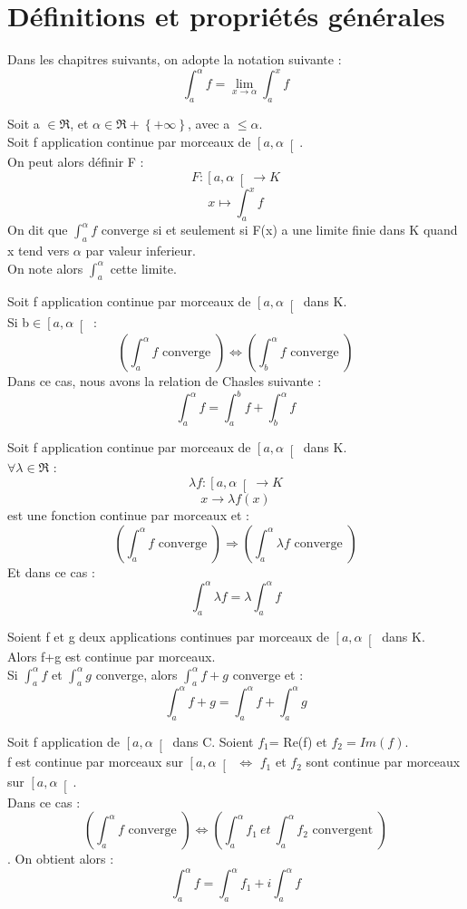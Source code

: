 \section{Définitions et propriétés générales}
Dans les chapitres suivants, on adopte la notation suivante : 
$$\int_a^{\alpha} f = \lim_{x \rightarrow \alpha} \int_a^x f$$
\begin{de}
Soit a $\in \Re$, et $\alpha \in \Re+\left\lbrace+\infty\right\rbrace $, avec a $\leq \alpha$.\\
Soit f application continue par morceaux de $\left[a,\alpha\right[$.\\
On peut alors définir F :
$$F : \left[a,\alpha\right[ \rightarrow K$$
$$x \mapsto \int_a^x f$$
On dit que $\int_a^{\alpha} f$ converge si et seulement si F(x) a une limite finie dans K quand x tend vers $\alpha$ par valeur inferieur.\\
On note alors $\int_a^{\alpha}$ cette limite.
\end{de}
\begin{prop}
Soit f application continue par morceaux de $\left[a,\alpha\right[$ dans K.\\
Si b$\in \left[a,\alpha\right[$ :
$$\left(\int_a^{\alpha} f \mbox{ converge }\right) \Leftrightarrow \left(\int_b^{\alpha} f \mbox{ converge } \right)$$
Dans ce cas, nous avons la relation de Chasles suivante :
$$\int_a^{\alpha} f = \int_a^b f + \int_b^{\alpha} f$$
\end{prop}
\begin{prop}
Soit f application continue par morceaux de $\left[a,\alpha\right[$ dans K.\\
$\forall \lambda \in \Re$ :  
$$\lambda f : \left[a,\alpha\right[ \rightarrow K$$
$$x\rightarrow\lambda f(x)$$
est une fonction continue par morceaux et :
$$\left(\int_a^{\alpha} f \mbox{ converge }\right) \Rightarrow \left(\int_a^{\alpha} \lambda f \mbox{ converge }\right)$$
Et dans ce cas :
$$\int_a^{\alpha} \lambda f = \lambda \int_a^{\alpha} f$$
\end{prop}
\begin{prop}
Soient f et g deux applications continues par morceaux de $\left[a,\alpha\right[$ dans K.\\
Alors f+g est continue par morceaux.\\
Si $\int_a^{\alpha} f$ et $\int_a^{\alpha} g$ converge, alors $\int_a^{\alpha} f+g$ converge et :
$$\int_a^{\alpha} f+g = \int_a^{\alpha} f + \int_a^{\alpha} g$$
\end{prop}
\begin{prop}
Soit f application de $\left[a,\alpha\right[$ dans C. Soient $f_1 $= Re(f) et $f_2 = Im(f)$.\\
f est continue par morceaux sur $\left[a,\alpha\right[$ $\Leftrightarrow$ $f_1$ et $f_2$ sont continue par morceaux sur $\left[a,\alpha\right[$.\\
Dans ce cas : 
$$\left(\int_a^{\alpha} f \mbox{ converge }\right) \Leftrightarrow \left(\int_a^{\alpha} f_1 ~et~ \int_a^{\alpha}  f_2\mbox{ convergent }\right)$$.
On obtient alors : 
$$\int_a^{\alpha} f = \int_a^{\alpha} f_1 + i\int_a^{\alpha} f$$
\end{prop}
